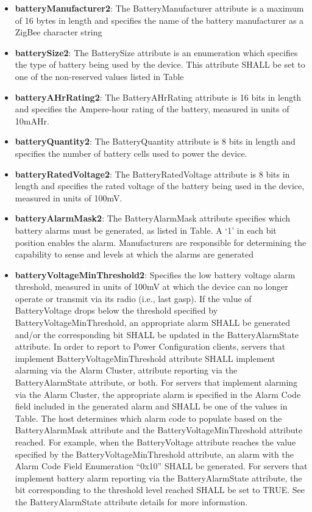 \begin{itemize}
\item \textbf{batteryManufacturer2}: The BatteryManufacturer attribute is a maximum of 16 bytes in length and specifies the name of the battery manufacturer as a ZigBee character string
\item \textbf{batterySize2}: The BatterySize attribute is an enumeration which specifies the type of battery being used by the device. This attribute SHALL be set to one of the non-reserved values listed in Table
\item \textbf{batteryAHrRating2}: The BatteryAHrRating attribute is 16 bits in length and specifies the Ampere-hour rating of the battery, measured in units of 10mAHr.
\item \textbf{batteryQuantity2}: The BatteryQuantity attribute is 8 bits in length and specifies the number of battery cells used to power the device.
\item \textbf{batteryRatedVoltage2}: The BatteryRatedVoltage attribute is 8 bits in length and specifies the rated voltage of the battery being used in the device, measured in units of 100mV.
\item \textbf{batteryAlarmMask2}: The BatteryAlarmMask attribute specifies which battery alarms must be generated, as listed in Table. A ‘1’ in each bit position enables the alarm. Manufacturers are responsible for determining the capability to sense and levels at which the alarms are generated
\item \textbf{batteryVoltageMinThreshold2}: Specifies the low battery voltage alarm threshold, measured in units of 100mV at which the device can no longer operate or transmit via its radio (i.e., last gasp). If the value of BatteryVoltage drops below the threshold specified by BatteryVoltageMinThreshold, an appropriate alarm SHALL be generated and/or the corresponding bit SHALL be updated in the BatteryAlarmState attribute. In order to report to Power Configuration clients, servers that implement BatteryVoltageMinThreshold attribute SHALL implement alarming via the Alarm Cluster, attribute reporting via the BatteryAlarmState attribute, or both. For servers that implement alarming via the Alarm Cluster, the appropriate alarm is specified in the Alarm Code field included in the generated alarm and SHALL be one of the values in Table. The host determines which alarm code to populate based on the BatteryAlarmMask attribute and the BatteryVoltageMinThreshold attribute reached. For example, when the BatteryVoltage attribute reaches the value specified by the BatteryVoltageMinThreshold attribute, an alarm with the Alarm Code Field Enumeration “0x10” SHALL be generated. For servers that implement battery alarm reporting via the BatteryAlarmState attribute, the bit corresponding to the threshold level reached SHALL be set to TRUE. See the BatteryAlarmState attribute details for more information.

\end{itemize}
